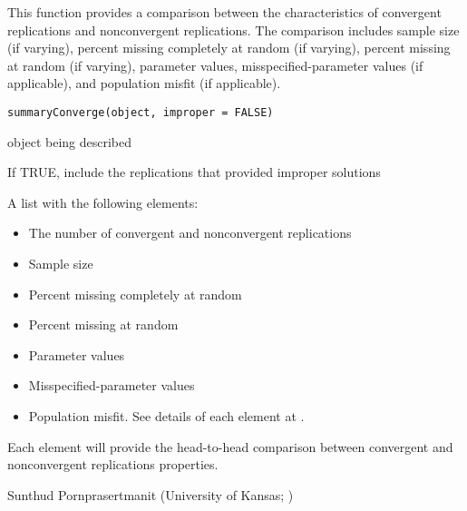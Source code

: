 \documentclass[a4paper]{book}
\begin{document}
%
\begin{Description}\relax
This function provides a comparison between the characteristics of convergent replications and nonconvergent replications. The comparison includes sample size (if varying), percent missing completely at random (if varying), percent missing at random (if varying), parameter values, misspecified-parameter values (if applicable), and population misfit (if applicable).
\end{Description}
%
\begin{Usage}
\begin{verbatim}
summaryConverge(object, improper = FALSE)
\end{verbatim}
\end{Usage}
%
\begin{Arguments}
\begin{ldescription}
\item[\code{object}] 
 object being described

\item[\code{improper}] 
If TRUE, include the replications that provided improper solutions

\end{ldescription}
\end{Arguments}
%
\begin{Value}
A list with the following elements:
\begin{itemize}

\item {} The number of convergent and nonconvergent replications
\item {} Sample size
\item {} Percent missing completely at random
\item {} Percent missing at random
\item {} Parameter values
\item {} Misspecified-parameter values
\item {} Population misfit. See details of each element at .

\end{itemize}

Each element will provide the head-to-head comparison between convergent and nonconvergent replications properties.
\end{Value}
%
\begin{Author}\relax
Sunthud Pornprasertmanit (University of Kansas; )
\end{Author}
\end{document}
